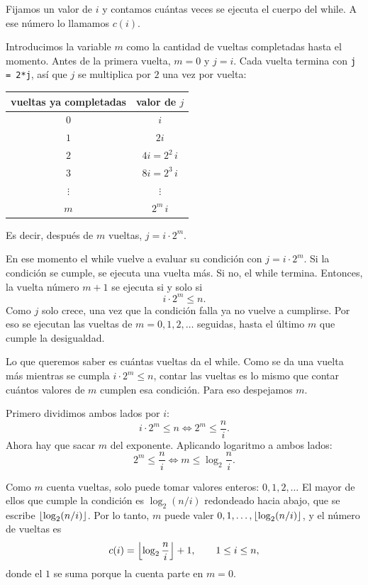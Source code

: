 Fijamos un valor de $i$ y contamos cuántas veces se ejecuta el cuerpo del while. A ese
número lo llamamos $c(i)$.

Introducimos la variable $m$ como la cantidad de vueltas completadas hasta el momento.
Antes de la primera vuelta, $m = 0$ y $j = i$. Cada vuelta termina con \texttt{j = 2*j},
así que $j$ se multiplica por $2$ una vez por vuelta:
\begin{center}
\begin{tabular}{cc}
  \toprule
  vueltas ya completadas & valor de $j$ \\
  \midrule
  $0$ & $i$ \\
  $1$ & $2i$ \\
  $2$ & $4i = 2^2\, i$ \\
  $3$ & $8i = 2^3\, i$ \\
  $\vdots$ & $\vdots$ \\
  $m$ & $2^m\, i$ \\
  \bottomrule
\end{tabular}
\end{center}
Es decir, después de $m$ vueltas, $j = i \cdot 2^m$.

En ese momento el while vuelve a evaluar su condición con $j = i\cdot 2^m$. Si la condición se cumple, se ejecuta una vuelta más. Si no, el while
termina. Entonces, la vuelta número $m + 1$ se ejecuta si y solo si
\[
  i \cdot 2^m \le n.
\]
Como $j$ solo crece, una vez que la condición falla ya no vuelve a cumplirse. Por eso se
ejecutan las vueltas de $m = 0, 1, 2, \dots$ seguidas, hasta el último $m$ que cumple la
desigualdad.

Lo que queremos saber es cuántas vueltas da el while. Como se da una vuelta más
mientras se cumpla $i \cdot 2^m \le n$, contar las vueltas es lo mismo que contar
cuántos valores de $m$ cumplen esa condición. Para eso despejamos $m$.

Primero dividimos ambos lados por $i$:
\[
  i \cdot 2^m \le n \iff 2^m \le \frac{n}{i}.
\]
Ahora hay que sacar $m$ del exponente. Aplicando logaritmo a ambos lados:
\[
  2^m \le \frac{n}{i} \iff m \le \log_2 \frac{n}{i}.
\]

Como $m$ cuenta vueltas, solo puede tomar valores enteros: $0, 1, 2, \dots$ El mayor de
ellos que cumple la condición es $\log_2(n/i)$ redondeado hacia abajo, que se escribe
$\floor{\log_2(n/i)}$. Por lo tanto, $m$ puede valer $0, 1, \dots, \floor{\log_2(n/i)}$,
y el número de vueltas es
\[
  c(i) = \floor*{\log_2 \frac{n}{i}} + 1, \qquad 1 \le i \le n,
\]
donde el $1$ se suma porque la cuenta parte en $m = 0$.

